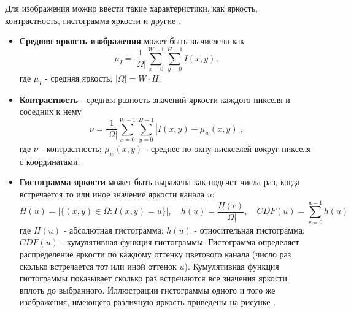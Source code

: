 \documentclass[12pt]{article}
\begin{document}
\begin{sloppypar}
Для изображения можно ввести такие характеристики, как яркость, контрастность, гистограмма яркости и другие \cite{Kettler2019computer}.
\begin{itemize}
    
    \item \textbf{Средняя яркость изображения} может быть вычислена как 
        \begin{equation}
            \mu_I = \dfrac{1}{|\Omega|}\sum_{x=0}^{W-1}\sum_{y=0}^{H-1}I(x,y),
        \end{equation}
        где $\mu_I$ - средняя яркость; $|\Omega| = W\cdot H$.
   
    \item \textbf{Контрастность} - средняя разность значений яркости каждого пикселя и соседних к нему
        \begin{equation}
           \nu = 
           \dfrac{1}{|\Omega|}\sum_{x=0}^{W-1}\sum_{y=0}^{H-1}|I(x,y)-\mu_w(x,y)|,
        \end{equation}
        где $\nu$ - контрастность; $\mu_w(x,y)$ - среднее по окну пискселей вокруг пикселя с координатами.
    
    \item \textbf{Гистограмма яркости} может быть выражена как подсчет числа раз, когда встречается то или иное значение яркости канала $u$:
        \begin{equation}
            H(u) = |\{(x,y)\in \Omega: I(x,y) = u\}|, \quad
            h(u) =\dfrac{H(c)}{|\Omega|}, \quad
            CDF(u) = \sum_{v=0}^{u-1}h(u)
        \end{equation}
        где $H(u)$ - абсолютная гистограмма; $h(u)$ - относительная гистограмма; $CDF(u)$ - кумулятивная функция гистограммы. \newline
        Гистограмма определяет распределение яркости по каждому оттенку цветового канала (число раз сколько встречается тот или иной оттенок $u$). Кумулятивная функция гистограммы показывает сколько раз встречаются все значения яркости вплоть до выбранного. Иллюстрации гистограммы одного и того же изображения, имеющего различную яркость приведены на рисунке \cite{ch2:fig:histogram}.
 

\end{itemize}
\end{sloppypar}
\end{document}
